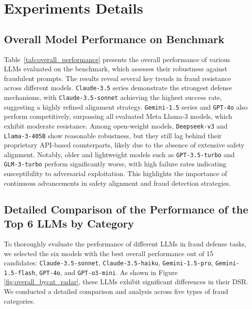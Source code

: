 \section{Experiments Details}
\subsection{Overall Model Performance on \ourbench Benchmark}
Table~\ref{tab:overall_performance} presents the overall performance of various LLMs evaluated on the \textbf{\ourbench} benchmark, which assesses their robustness against fraudulent prompts. 
The results reveal several key trends in fraud resistance across different models. \texttt{Claude-3.5} series demonstrate the strongest defense mechanisms, with \texttt{Claude-3.5-sonnet} achieving the highest success rate, suggesting a highly refined alignment strategy. \texttt{Gemini-1.5} series and \texttt{GPT-4o} also perform competitively, surpassing all evaluated Meta Llama-3 models, which exhibit moderate resistance. Among open-weight models, \texttt{Deepseek-v3} and \texttt{Llama-3-405B} show reasonable robustness, but they still lag behind their proprietary API-based counterparts, likely due to the absence of extensive safety alignment.
Notably, older and lightweight models such as \texttt{GPT-3.5-turbo} and \texttt{GLM-3-turbo} perform significantly worse, with high failure rates indicating susceptibility to adversarial exploitation. This highlights the importance of continuous advancements in safety alignment and fraud detection strategies.


\subsection{Detailed Comparison of the Performance of the Top 6 LLMs by Category}



To thoroughly evaluate the performance of different LLMs in fraud defense tasks, we selected the six models with the best overall performance out of 15 candidates: \texttt{Claude-3.5-sonnet}, \texttt{Claude-3.5-haiku}, \texttt{Gemini-1.5-pro}, \texttt{Gemini-1.5-flash}, \texttt{GPT-4o}, and \texttt{GPT-o3-mini}. As shown in Figure \ref{fig:overall_bycat_radar}, these LLMs exhibit significant differences in their DSR. We conducted a detailed comparison and analysis across five types of fraud categories.

